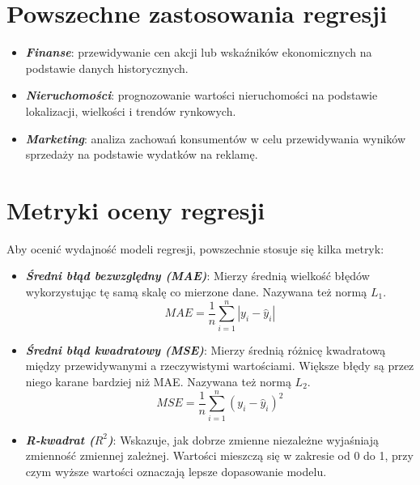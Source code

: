 \section*{Powszechne zastosowania regresji}

\vspace{-1.0em}

\begin{itemize}
    \item \textbf{\textit{Finanse}}: przewidywanie cen akcji lub wskaźników ekonomicznych na podstawie danych historycznych.
    \item \textbf{\textit{Nieruchomości}}: prognozowanie wartości nieruchomości na podstawie lokalizacji, wielkości i trendów rynkowych.
    \item \textbf{\textit{Marketing}}: analiza zachowań konsumentów w celu przewidywania wyników sprzedaży na podstawie wydatków na reklamę.
\end{itemize}

\section*{Metryki oceny regresji \cite{alma991000280759708832}}

\vspace{-1.0em}

\hspace{1.5cm} Aby ocenić wydajność modeli regresji, powszechnie stosuje się kilka metryk:
\begin{itemize}
    \item \textbf{\textit{Średni błąd bezwzględny (MAE)}}: Mierzy średnią wielkość błędów wykorzystując tę samą skalę co mierzone dane. Nazywana też normą $L_{1}$.
    \[
    MAE = \frac{1}{n} \sum_{i=1}^{n} |y_i - \hat{y}_i|
    \]

    \item \textbf{\textit{Średni błąd kwadratowy (MSE)}}: Mierzy średnią różnicę kwadratową między przewidywanymi a rzeczywistymi wartościami. Większe błędy są przez niego karane bardziej niż MAE. Nazywana też normą $L_{2}$.
    \[
    MSE = \frac{1}{n} \sum_{i=1}^{n} (y_i - \hat{y}_i)^2
    \]

    \item \textbf{\textit{R-kwadrat ($R^2$)}}: Wskazuje, jak dobrze zmienne niezależne wyjaśniają zmienność zmiennej zależnej. Wartości mieszczą się w zakresie od 0 do 1, przy czym wyższe wartości oznaczają lepsze dopasowanie modelu.
\end{itemize}

